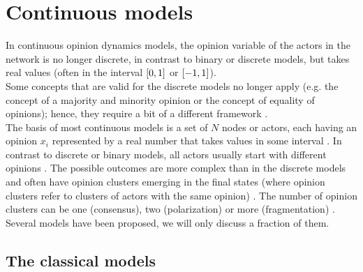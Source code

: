 \documentclass[11 pt , letterpaper , twoside , openright]{book}
\begin{document}
\section{Continuous models}\label{Con}

In continuous opinion dynamics models, the opinion variable of the actors in the network is no longer discrete, in contrast to binary or discrete models, but takes real values (often in the interval $\interval{0}{1}$ or $\interval{-1}{1}$).\\
\newline
Some concepts that are valid for the discrete models no longer apply (e.g. the concept of a majority and minority opinion or the concept of equality of opinions); hence, they require a bit of a different framework \cite{Castellano2009}. \\
\newline
The basis of most continuous models is a set of $N$ nodes or actors, each having an opinion $x_i$ represented by a real number that takes values in some interval \cite{Castellano2009}. In contrast to discrete or binary models, all actors usually start with different opinions \cite{Castellano2009}. The possible outcomes are more complex than in the discrete models and often have opinion clusters emerging in the final states (where opinion clusters refer to clusters of actors with the same opinion) \cite{Castellano2009}. The number of opinion clusters can be one (consensus), two (polarization) or more (fragmentation) \cite{Castellano2009}. \\
\newline
Several models have been proposed, we will only discuss a fraction of them.

\subsection{The classical models}\label{classMod}
\end{document}
